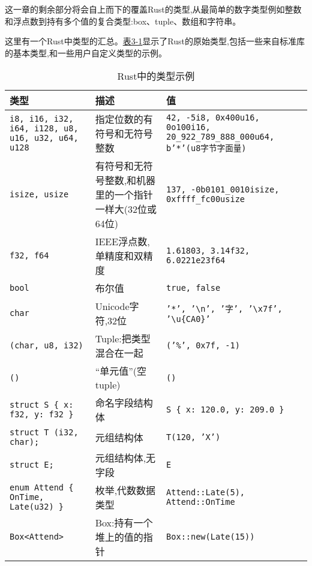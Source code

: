 这一章的剩余部分将会自上而下的覆盖Rust的类型,从最简单的数字类型例如整数和浮点数到持有多个值的复合类型:box、tuple、数组和字符串。

这里有一个Rust中类型的汇总。\hyperref[t3-1]{表3-1}显示了Rust的原始类型,包括一些来自标准库的基本类型,和一些用户自定义类型的示例。

\begin{longtable}{p{}p{}p{}}
    \caption{Rust中的类型示例}
    \label{t3-1}\\
    \hline
    \textbf{类型}   & \textbf{描述}    & \textbf{值}    \\
    \hline
    \texttt{i8, i16, i32, i64, i128, u8, u16, u32, u64, u128}    & 指定位数的有符号和无符号整数 & \texttt{42, -5i8, 0x400u16, 0o100i16, 20\_922\_789\_888\_000u64, b'*'(u8字节字面量)}    \\
    \rowcolor{tablecolor}
    \texttt{isize, usize}   & 有符号和无符号整数,和机器里的一个指针一样大(32位或64位)   & \texttt{137, -0b0101\_0010isize, 0xffff\_fc00usize} \\
    \texttt{f32, f64}       & IEEE浮点数,单精度和双精度                                & \texttt{1.61803, 3.14f32, 6.0221e23f64} \\
    \rowcolor{tablecolor}
    \texttt{bool}           & 布尔值            & \texttt{true, false} \\
    \texttt{char}           & Unicode字符,32位 & \texttt{'*', '\textbackslash n', '字', '\textbackslash x7f', '\textbackslash u\{CA0\}'} \\
    \rowcolor{tablecolor}
    \texttt{(char, u8, i32)}                        & Tuple:把类型混合在一起   & \texttt{('\%', 0x7f, -1)} \\
    \texttt{()}                                     & “单元值”(空tuple)      & \texttt{()} \\
    \rowcolor{tablecolor}
    \texttt{struct S \{ x: f32, y: f32 \}}          & 命名字段结构体            & \texttt{S \{ x: 120.0, y: 209.0 \}} \\
    \texttt{struct T (i32, char);}                  & 元组结构体                & \texttt{T(120, 'X')} \\
    \rowcolor{tablecolor}
    \texttt{struct E;}                              & 元组结构体,无字段        & \texttt{E} \\
    \texttt{enum Attend \{ OnTime, Late(u32) \}}    & 枚举,代数数据类型        & \texttt{Attend::Late(5), Attend::OnTime} \\
    \rowcolor{tablecolor}
    \texttt{Box<Attend>}                             & Box:持有一个堆上的值的指针   & \texttt{Box::new(Late(15))} \\

\end{longtable}
